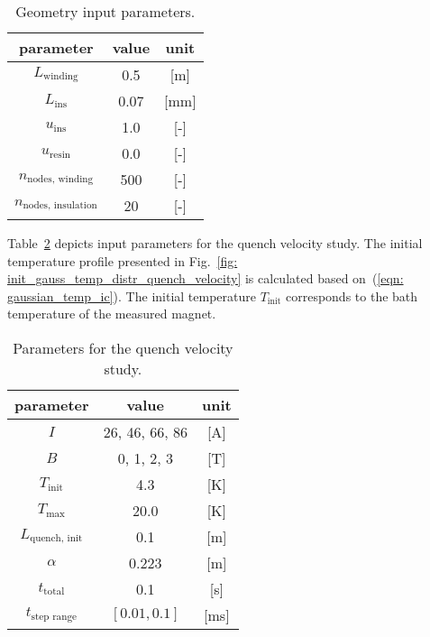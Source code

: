 \begin{table}[H]
    \caption{Geometry input parameters.} 
    \vspace{-1.em} 
    \fontsize{10}{10}
    \selectfont 
    \renewcommand{\arraystretch}{1.5}
    \begin{center}
        \begin{tabular}{ ccc }  
        \hline
        parameter & value & unit \\
        \hline
        $L_\text{winding}$ & 0.5 & [m] \\ 
        $L_\text{ins}$ & 0.07 & [mm] \\
        $u_\text{ins}$ & 1.0 & [-] \\
        $u_\text{resin}$ & 0.0 & [-] \\
        $n_\text{nodes, winding}$ & 500 & [-] \\ 
        $n_\text{nodes, insulation}$ & 20 & [-] \\
        \hline 
        \end{tabular}
    \end{center}  
     \label{table: quench_velocity_map_input_parameters_geometry} 
 \end{table}

Table~\ref{table: quench_velocity_map_input_parameters} depicts input parameters for the quench velocity study. The initial temperature profile presented in Fig.~\ref{fig: init_gauss_temp_distr_quench_velocity} is calculated based on~(\ref{eqn: gaussian_temp_ic}). The initial temperature $T_\text{init}$ corresponds to the bath temperature of the measured magnet. 

\begin{table}[H]
    \caption{Parameters for the quench velocity study.} 
    \vspace{-1.em} 
    \fontsize{10}{10}
    \selectfont 
    \renewcommand{\arraystretch}{1.5}
    \begin{center}
        \begin{tabular}{ ccc }  
        \hline
        parameter & value & unit \\
        \hline
        $I$ & 26, 46, 66, 86 & [A] \\
        $B$ & 0, 1, 2, 3 & [T] \\
        $T_\text{init}$ & 4.3 & [K] \\
        $T_\text{max}$ & 20.0 & [K] \\
        $L_\text{quench, init}$ & 0.1 & [m] \\ 
        $\alpha$ & 0.223 & [m] \\   
        $t_\text{total}$ & 0.1 & [s] \\
        $t_\text{step range}$ & $[0.01, 0.1]$ & [ms] \\
        \hline 
        \end{tabular}
    \end{center}  
     \label{table: quench_velocity_map_input_parameters} 
 \end{table}

